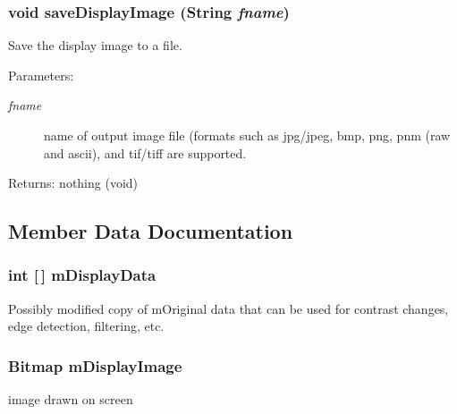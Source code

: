 \subsubsection{\setlength{\rightskip}{0pt plus 5cm}void save\-Display\-Image (String {\em fname})}\label{class_c_s_image_viewer_1_1_image_data_2b0a4698a0a81bc02802c6d3fc7fed04}


Save the display image to a file. 

\begin{Desc}
\item[Parameters:]
\begin{description}
\item[{\em fname}]name of output image file (formats such as jpg/jpeg, bmp, png, pnm (raw and ascii), and tif/tiff are supported. \end{description}
\end{Desc}
\begin{Desc}
\item[Returns:]nothing (void) \end{Desc}


\subsection{Member Data Documentation}
\subsubsection{\setlength{\rightskip}{0pt plus 5cm}int [$\,$] {\bf m\-Display\-Data}}\label{class_c_s_image_viewer_1_1_image_data_7c1ea11a57f2825044182dc429af34fe}


Possibly modified copy of m\-Original data that can be used for contrast changes, edge detection, filtering, etc. 

\subsubsection{\setlength{\rightskip}{0pt plus 5cm}Bitmap {\bf m\-Display\-Image}}\label{class_c_s_image_viewer_1_1_image_data_05fc17ff76a3924756de554b68af6731}


image drawn on screen 


